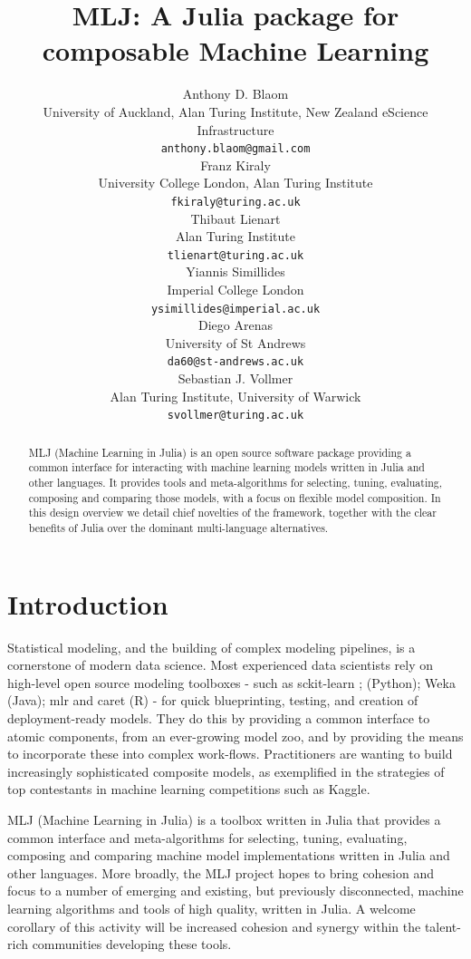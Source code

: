\documentclass{article}
\title{MLJ: A Julia package for composable Machine Learning}
\author{
 Anthony D. Blaom \\
  University of Auckland, Alan Turing Institute, New Zealand eScience Infrastructure\\
  \texttt{anthony.blaom@gmail.com} \\
  \And
 Franz Kiraly \\
  University College London, Alan Turing Institute\\
  \texttt{fkiraly@turing.ac.uk} \\
  \And
 Thibaut Lienart \\
  Alan Turing Institute\\
  \texttt{tlienart@turing.ac.uk} \\
  \And
 Yiannis Simillides \\
  Imperial College London\\
  \texttt{ysimillides@imperial.ac.uk} \\
  \And
 Diego Arenas \\
  University of St Andrews\\
  \texttt{da60@st-andrews.ac.uk} \\
  \And
 Sebastian J. Vollmer \\
  Alan Turing Institute, University of Warwick\\
  \texttt{svollmer@turing.ac.uk} \\
}
\begin{document}
\maketitle

\begin{abstract}
MLJ (Machine Learning in Julia) is an open source software package
providing a common interface for interacting with machine learning
models written in Julia and other languages. It provides tools and
meta-algorithms for selecting, tuning, evaluating, composing and
comparing those models, with a focus on flexible model composition. In
this design overview we detail chief novelties of the framework,
together with the clear benefits of Julia over the dominant
multi-language alternatives.
\end{abstract}


\section{Introduction}

Statistical modeling, and the building of complex modeling pipelines,
is a cornerstone of modern data science. Most experienced data
scientists rely on high-level open source modeling toolboxes - such as
sckit-learn \cite{Pedregosa2001}; \cite{Buitinck2013} (Python); Weka
\cite{Holmes1994} (Java); mlr \cite{BischlEtal2016} and caret
\cite{Kuhn2008} (R) - for quick blueprinting, testing, and creation of
deployment-ready models. They do this by providing a common interface
to atomic components, from an ever-growing model zoo, and by providing
the means to incorporate these into complex work-flows. Practitioners
are wanting to build increasingly sophisticated composite models, as
exemplified in the strategies of top contestants in machine learning
competitions such as Kaggle.

MLJ (Machine Learning in Julia) \cite{MLJ} is a toolbox written in
Julia that provides a common interface and meta-algorithms for
selecting, tuning, evaluating, composing and comparing machine model
implementations written in Julia and other languages. More broadly,
the MLJ project hopes to bring cohesion and focus to a number of
emerging and existing, but previously disconnected, machine learning
algorithms and tools of high quality, written in Julia. A welcome
corollary of this activity will be increased cohesion and synergy
within the talent-rich communities developing these tools.
\end{document}
